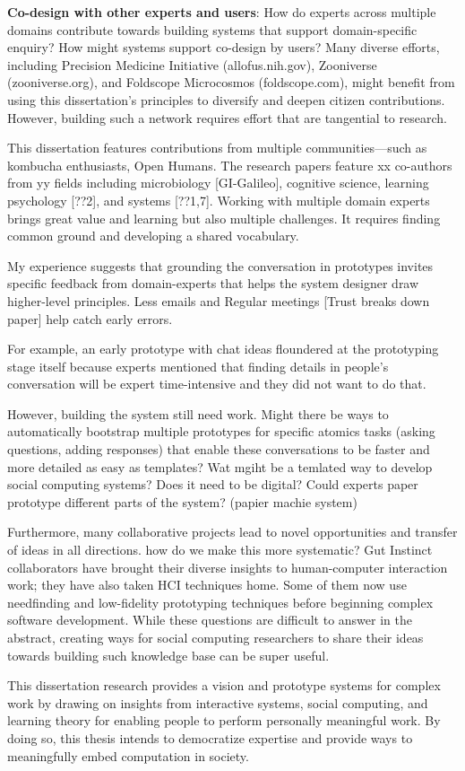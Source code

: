 \textbf{Co-design with other experts and users}: How do experts across multiple domains contribute towards building systems that support domain-specific enquiry? How might systems support co-design by users?
Many diverse efforts, including Precision Medicine Initiative (allofus.nih.gov), Zooniverse (zooniverse.org), and Foldscope Microcosmos (foldscope.com), might benefit from using this dissertation’s principles to diversify and deepen citizen contributions. However, building such a network requires effort that are tangential to research. 

This dissertation features contributions from multiple communities—such as kombucha enthusiasts, Open Humans. The research papers feature xx co-authors from yy fields including microbiology [GI-Galileo], cognitive science, learning psychology [??2], and systems [??1,7]. Working with multiple domain experts brings great value and learning but also multiple challenges. It requires finding common ground and developing a shared vocabulary. 

My experience suggests that grounding the conversation in prototypes invites specific feedback from domain-experts that helps the system designer draw higher-level principles. Less emails and Regular meetings [Trust breaks down paper] help catch early errors.

For example, an early prototype with chat ideas floundered at the prototyping stage itself because experts mentioned that finding details in people's conversation will be expert time-intensive and they did not want to do that. 

However, building the system still need work. Might there be ways to automatically bootstrap multiple prototypes for specific atomics tasks (asking questions, adding responses) that enable these conversations to be faster and more detailed as easy as templates? Wat mgiht be a temlated way to develop social computing systems? Does it need to be digital? Could experts paper prototype different parts of the system? (papier machie system)

Furthermore, many collaborative projects lead to novel opportunities and transfer of ideas in all directions. how do we make this more systematic? Gut Instinct collaborators have brought their diverse insights to human-computer interaction work; they have also taken HCI techniques home. Some of them now use needfinding and low-fidelity prototyping techniques before beginning complex software development. While these questions are difficult to answer in the abstract, creating ways for social computing researchers to share their ideas towards building such knowledge base can be super useful.    %




This dissertation research provides a vision and prototype systems for complex work by drawing on insights from interactive systems, social computing, and learning theory  for enabling people to perform personally meaningful work. By doing so, this thesis intends to democratize expertise and provide ways to meaningfully embed computation in society. 
